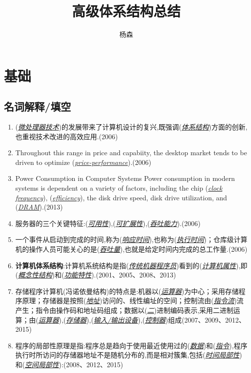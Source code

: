 \documentclass[a4paper]{ctexbook}
\newcommand{\blank}[1]{(\emph{\underline{#1}})}
\begin{document}
\begin{titlepage}
  \thispagestyle{empty}
  \title{高级体系结构总结}
  \author{杨森}
  \maketitle
\end{titlepage}
\thispagestyle{empty}

\chapter{基础}
\setcounter{page}{1}
\section{名词解释/填空}
\begin{enumerate}
  \item (\emph{\underline{微处理器技术}})的发展带来了计算机设计的复兴,既强调(\emph{\underline{体系结构}})方面的创新,也重视技术改进的高效应用.(2006)
  \item Throughout this range in price and capabiity, the desktop market tends to be driven to optimize (\emph{\underline{price-performance}}).(2006)
  \item Power Consumption in Computer Systems Power consumption in modern systems is dependent on a variety of factors, including the chip \blank{clock frequency}, \blank{efficiency}, the disk drive speed, disk drive utilization, and \blank{DRAM}.(2013)
  \item 服务器的三个关键特征:(\emph{\underline{可用性}}),(\emph{\underline{可扩展性}}),(\emph{\underline{吞吐能力}}).(2006)
  \item 一个事件从启动到完成的时间,称为(\emph{\underline{响应时间}}),也称为(\emph{\underline{执行时间}})；仓库级计算机的操作人员可能关心的是(\emph{\underline{吞吐量}}),也就是给定时间内完成的总工作量.(2006)
  \item \textbf{计算机体系结构}:计算机系统结构是指\blank{传统机器程序员}看到的\blank{计算机属性},即\blank{概念性结构}和\blank{功能特性}.(2001、2005、2008、2013)
  \item 存储程序计算机(冯诺依曼结构)的特点是:机器以(\emph{\underline{运算器}})为中心；采用存储程序原理；存储器是按照(\emph{\underline{地址}})访问的、线性编址的空间；控制流由(\emph{\underline{指令流}})流产生；指令由操作码和地址码组成；数据以(\emph{\underline{二}})进制编码表示,采用二进制运算；由\blank{运算器},\blank{存储器},\blank{输入/输出设备},\blank{控制器}组成(2007、2009、2012、2015)
  \item 程序的局部性原理是指:程序总是趋向于使用最近使用过的(\emph{\underline{数据}})和(\emph{\underline{指令}}),程序执行时所访问的存储器地址不是随机分布的,而是相对簇集,包括(\emph{\underline{时间局部性}})和(\emph{\underline{空间局部性}}):(2008、2012、2015)

\end{enumerate}
\end{document}
